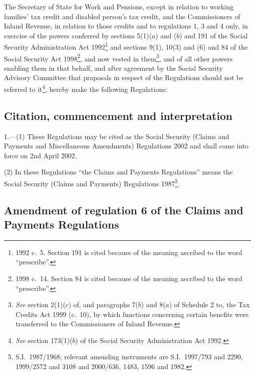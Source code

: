 \documentclass[12pt,a4paper]{article}
\title{\regstitle}
\author{S.I.\ 2002 No.\ 428}
\date{Made
26th February 2002\\
Laid before Parliament
5th March 2002\\
Coming into force
2nd April 2002
}
\begin{document}
\maketitle

\noindent
The Secretary of State for Work and Pensions, except in relation to working families' tax credit and disabled person’s tax credit, and the Commissioners of Inland Revenue, in relation to those credits and to regulations 1, 3 and 4 only, in exercise of the powers conferred by sections 5(1)($a$)  and ($b$)  and 191 of the Social Security Administration Act 1992\footnote{1992 c.\ 5. Section 191 is cited because of the meaning ascribed to the word “prescribe”.} and sections 9(1), 10(3) and (6) and 84 of the Social Security Act 1998\footnote{1998 c.\ 14. Section 84 is cited because of the meaning ascribed to the word “prescribe”.}, and now vested in them\footnote{\emph{See} section 2(1)($c$) of, and paragraphs 7($b$) and 8($a$) of Schedule 2 to, the Tax Credits Act 1999 (c.\ 10), by which functions concerning certain benefits were transferred to the Commissioners of Inland Revenue.}, and of all other powers enabling them in that behalf, and after agreement by the Social Security Advisory Committee that proposals in respect of the Regulations should not be referred to it\footnote{\emph{See} section 173(1)($b$) of the Social Security Administration Act 1992.}, hereby make the following Regulations: 

{\sloppy

\tableofcontents

}

\bigskip

\setcounter{secnumdepth}{-2}

\subsection[1. Citation, commencement and interpretation]{Citation, commencement and interpretation}

1.---(1)  These Regulations may be cited as the Social Security (Claims and Payments and Miscellaneous Amendments) Regulations 2002 and shall come into force on 2nd April 2002.

(2) In these Regulations “the Claims and Payments Regulations” means the Social Security (Claims and Payments) Regulations 1987\footnote{S.I.\ 1987/1968; relevant amending instruments are S.I.\ 1997/793 and 2290, 1999/2572 and 3108 and 2000/636, 1483, 1596 and 1982.}.

\subsection[2. Amendment of regulation 6 of the Claims and Payments Regulations]{Amendment of regulation 6 of the Claims and Payments Regulations}
\end{document}
